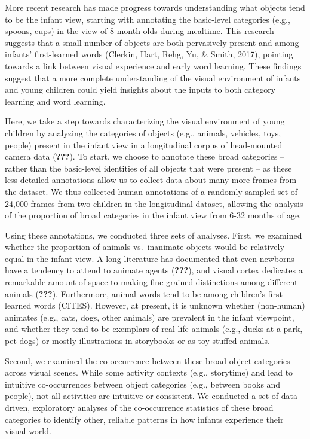 \documentclass[10pt, letterpaper]{article}
\begin{document}
More recent research has made progress towards understanding what
objects tend to be the infant view, starting with annotating the
basic-level categories (e.g., spoons, cups) in the view of 8-month-olds
during mealtime. This research suggests that a small number of objects
are both pervasively present and among infants' first-learned words
(Clerkin, Hart, Rehg, Yu, \& Smith, 2017), pointing towards a link
between visual experience and early word learning. These findings
suggest that a more complete understanding of the visual environment of
infants and young children could yield insights about the inputs to both
category learning and word learning.

Here, we take a step towards characterizing the visual environment of
young children by analyzing the categories of objects (e.g., animals,
vehicles, toys, people) present in the infant view in a longitudinal
corpus of head-mounted camera data ({\textbf{???}}). To start, we choose
to annotate these broad categories -- rather than the basic-level
identities of all objects that were present -- as these less detailed
annotations allow us to collect data about many more frames from the
dataset. We thus collected human annotations of a randomly sampled set
of 24,000 frames from two children in the longitudinal dataset, allowing
the analysis of the proportion of broad categories in the infant view
from 6-32 months of age.

Using these annotations, we conducted three sets of analyses. First, we
examined whether the proportion of animals vs.~inanimate objects would
be relatively equal in the infant view. A long literature has documented
that even newborns have a tendency to attend to animate agents
({\textbf{???}}), and visual cortex dedicates a remarkable amount of
space to making fine-grained distinctions among different animals
({\textbf{???}}). Furthermore, animal words tend to be among children's
first-learned words (CITES). However, at present, it is unknown whether
(non-human) animates (e.g., cats, dogs, other animals) are prevalent in
the infant viewpoint, and whether they tend to be exemplars of real-life
animals (e.g., ducks at a park, pet dogs) or mostly illustrations in
storybooks or as toy stuffed animals.

Second, we examined the co-occurrence between these broad object
categories across visual scenes. While some activity contexts (e.g.,
storytime) and lead to intuitive co-occurrences between object
categories (e.g., between books and people), not all activities are
intuitive or consistent. We conducted a set of data-driven, exploratory
analyses of the co-occurrence statistics of these broad categories to
identify other, reliable patterns in how infants experience their visual
world.
\end{document}

